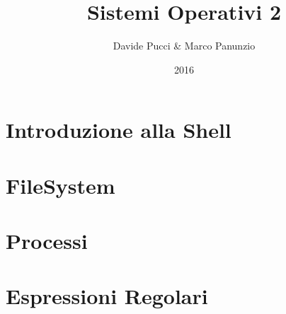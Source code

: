 

\title{Sistemi Operativi 2}
\author{Davide Pucci \& Marco Panunzio}
\date{2016}

\maketitle
\tableofcontents

\chapter{Introduzione alla Shell}


\chapter{FileSystem}


\chapter{Processi}


\chapter{Espressioni Regolari}


